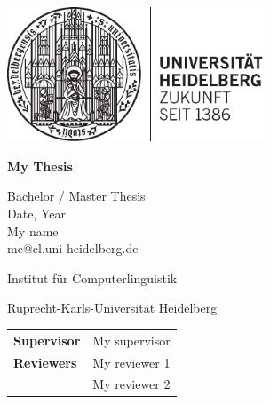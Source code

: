 
\sffamily
{} %
\pagestyle{empty}

\clearscrheadings\clearscrplain


\begin{flushright}
\includegraphics[height=40mm]{graphics/unihei_logo_bl.pdf} 
\vspace{20mm}
\end{flushright}

\begin{center}

\begin{Huge}
\vspace{2.5mm}
\textbf{My Thesis}
\end{Huge}


\vspace{20mm}
\begin{large}
Bachelor / Master Thesis\\
Date, Year\\

\vspace{1 cm}
My name\\
me@cl.uni-heidelberg.de\\
\end{large}
\vspace{2cm}

\begin{Large}
Institut für Computerlinguistik\\ %
\vspace{3mm}
\end{Large}{\Large Ruprecht-Karls-Universität Heidelberg}\\ %
\vspace{2cm}

\begin{tabular}{ll}
\textbf{Supervisor} & My supervisor\\
\textbf{Reviewers} & My reviewer 1\\
 & My reviewer 2\\
\end{tabular}
\end{center}

